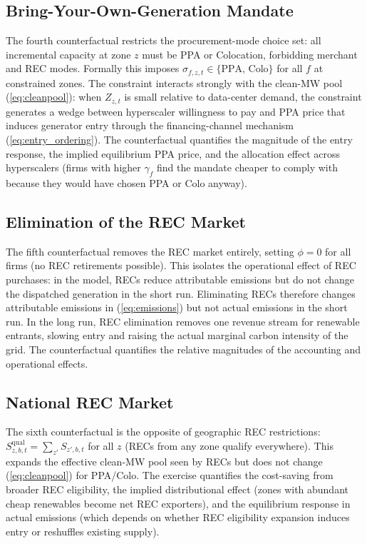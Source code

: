 \documentclass[12pt,letterpaper]{article}
\begin{document}
\subsection{Bring-Your-Own-Generation Mandate}

The fourth counterfactual restricts the procurement-mode choice set:
all incremental capacity at zone $z$ must be PPA or Colocation, forbidding
merchant and REC modes. Formally this imposes
$\sigma_{f,z,t} \in \{\text{PPA, Colo}\}$ for all $f$ at constrained zones.
The constraint interacts strongly with the clean-MW pool (\ref{eq:cleanpool}):
when $Z_{z,t}$ is small relative to data-center demand, the constraint
generates a wedge between hyperscaler willingness to pay and PPA price
that induces generator entry through the financing-channel mechanism
(\ref{eq:entry_ordering}). The counterfactual quantifies the magnitude
of the entry response, the implied equilibrium PPA price, and the
allocation effect across hyperscalers (firms with higher $\gamma_f$ find
the mandate cheaper to comply with because they would have chosen PPA
or Colo anyway).

\subsection{Elimination of the REC Market}

The fifth counterfactual removes the REC market entirely, setting
$\phi = 0$ for all firms (no REC retirements possible). This isolates
the operational effect of REC purchases: in the model, RECs reduce
attributable emissions but do not change the dispatched generation in
the short run. Eliminating RECs therefore changes attributable emissions
in (\ref{eq:emissions}) but not actual emissions in the short run.
In the long run, REC elimination removes one revenue stream for
renewable entrants, slowing entry and raising the actual marginal carbon
intensity of the grid. The counterfactual quantifies the relative
magnitudes of the accounting and operational effects.

\subsection{National REC Market}

The sixth counterfactual is the opposite of geographic REC restrictions:
$S^{\text{qual}}_{z,b,t} = \sum_{z'} S_{z',b,t}$ for all $z$ (RECs from
any zone qualify everywhere). This expands the effective clean-MW pool
seen by RECs but does not change (\ref{eq:cleanpool}) for PPA/Colo. The
exercise quantifies the cost-saving from broader REC eligibility, the
implied distributional effect (zones with abundant cheap renewables
become net REC exporters), and the equilibrium response in actual
emissions (which depends on whether REC eligibility expansion induces
entry or reshuffles existing supply).
\end{document}
